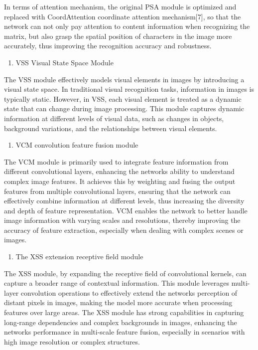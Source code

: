 \documentclass[
]{article}
\begin{document}
In terms of attention mechanism, the original PSA module is optimized
and replaced with CoordAttention coordinate attention mechanism{[}7{]},
so that the network can not only pay attention to content information
when recognizing the matrix, but also grasp the spatial position of
characters in the image more accurately, thus improving the recognition
accuracy and robustness.

\begin{enumerate}
\def\labelenumi{\arabic{enumi}.}
\item
  VSS Visual State Space Module
\end{enumerate}

The VSS module effectively models visual elements in images by
introducing a visual state space. In traditional visual recognition
tasks, information in images is typically static. However, in VSS, each
visual element is treated as a dynamic state that can change during
image processing. This module captures dynamic information at different
levels of visual data, such as changes in objects, background
variations, and the relationships between visual elements.

\begin{enumerate}
\def\labelenumi{\arabic{enumi}.}
\setcounter{enumi}{1}
\item
  VCM convolution feature fusion module
\end{enumerate}

The VCM module is primarily used to integrate feature information from
different convolutional layers, enhancing the network\textquotesingle s
ability to understand complex image features. It achieves this by
weighting and fusing the output features from multiple convolutional
layers, ensuring that the network can effectively combine information at
different levels, thus increasing the diversity and depth of feature
representation. VCM enables the network to better handle image
information with varying scales and resolutions, thereby improving the
accuracy of feature extraction, especially when dealing with complex
scenes or images.

\begin{enumerate}
\def\labelenumi{\arabic{enumi}.}
\setcounter{enumi}{2}
\item
  The XSS extension receptive field module
\end{enumerate}

The XSS module, by expanding the receptive field of convolutional
kernels, can capture a broader range of contextual information. This
module leverages multi-layer convolution operations to effectively
extend the network\textquotesingle s perception of distant pixels in
images, making the model more accurate when processing features over
large areas. The XSS module has strong capabilities in capturing
long-range dependencies and complex backgrounds in images, enhancing the
network\textquotesingle s performance in multi-scale feature fusion,
especially in scenarios with high image resolution or complex
structures.
\end{document}

